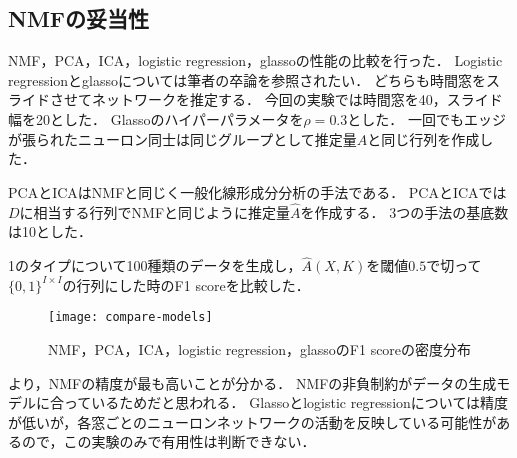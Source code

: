 \subsection{NMFの妥当性}
NMF，PCA，ICA，logistic regression，glassoの性能の比較を行った．
Logistic regressionとglassoについては筆者の卒論を参照されたい．
どちらも時間窓をスライドさせてネットワークを推定する．
今回の実験では時間窓を40，スライド幅を20とした．
Glassoのハイパーパラメータを$\rho = 0.3$とした．
一回でもエッジが張られたニューロン同士は同じグループとして推定量$\hat{A}$と同じ行列を作成した．

PCAとICAはNMFと同じく一般化線形成分分析の手法\cite{Cichocki2009}である．
PCAとICAでは$D$に相当する行列でNMFと同じように推定量$\hat{A}$を作成する．
3つの手法の基底数は10とした．

1のタイプについて100種類のデータを生成し，$\hat{A}(X,K)$を閾値$0.5$で切って$\{0,1\}^{I \times I}$の行列にした時のF1 scoreを比較した．
\begin{figure}[htbp]
    \begin{center}
        \texttt{[image: compare-models]}
        \caption{NMF，PCA，ICA，logistic regression，glassoのF1 scoreの密度分布}
        \label{fig:compare-models}
    \end{center}
\end{figure}
より，NMFの精度が最も高いことが分かる．
NMFの非負制約がデータの生成モデルに合っているためだと思われる．
Glassoとlogistic regressionについては精度が低いが，各窓ごとのニューロンネットワークの活動を反映している可能性があるので，この実験のみで有用性は判断できない．

